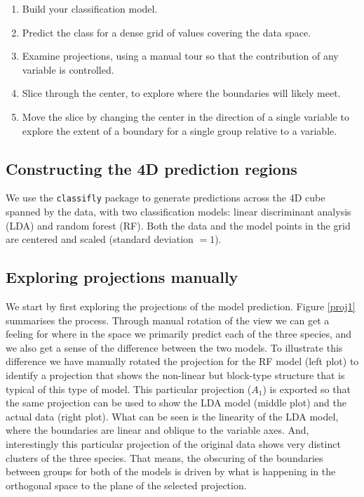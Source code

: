\documentclass[]{interact}
\theoremstyle{plain}%
\theoremstyle{definition}
\theoremstyle{remark}
\providecommand{\tightlist}{%
  \setlength{\itemsep}{0pt}\setlength{\parskip}{0pt}}
\def\tightlist{}
\begin{document}
\begin{enumerate}
\def\labelenumi{\arabic{enumi}.}
\tightlist
\item
  Build your classification model.
\item
  Predict the class for a dense grid of values covering the data space.
\item
  Examine projections, using a manual tour so that the contribution of
  any variable is controlled.
\item
  Slice through the center, to explore where the boundaries will likely
  meet.
\item
  Move the slice by changing the center in the direction of a single
  variable to explore the extent of a boundary for a single group
  relative to a variable.
\end{enumerate}

\hypertarget{constructing-the-4d-prediction-regions}{%
\subsection{Constructing the 4D prediction
regions}\label{constructing-the-4d-prediction-regions}}

We use the \texttt{classifly} package \citep{classifly} to generate
predictions across the 4D cube spanned by the data, with two
classification models: linear discriminant analysis (LDA) and random
forest (RF). Both the data and the model points in the grid are centered
and scaled (standard deviation \(= 1\)).

\hypertarget{exploring-projections-manually}{%
\subsection{Exploring projections
manually}\label{exploring-projections-manually}}

We start by first exploring the projections of the model prediction.
Figure \ref{proj1} summarises the process. Through manual rotation of
the view we can get a feeling for where in the space we primarily
predict each of the three species, and we also get a sense of the
difference between the two models. To illustrate this difference we have
manually rotated the projection for the RF model (left plot) to identify
a projection that shows the non-linear but block-type structure that is
typical of this type of model. This particular projection (\(A_1\)) is
exported so that the same projection can be used to show the LDA model
(middle plot) and the actual data (right plot). What can be seen is the
linearity of the LDA model, where the boundaries are linear and oblique
to the variable axes. And, interestingly this particular projection of
the original data shows very distinct clusters of the three species.
That means, the obscuring of the boundaries between groups for both of
the models is driven by what is happening in the orthogonal space to the
plane of the selected projection.
\end{document}
